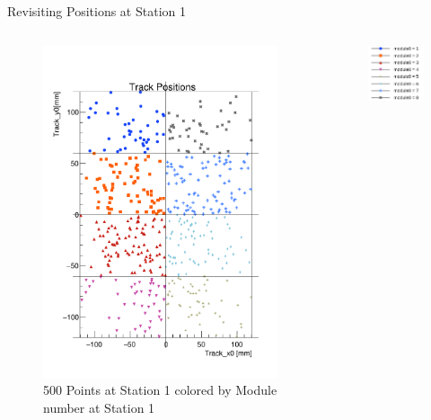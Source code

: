 \begin{frame}{Revisiting Positions at Station 1}
    \begin{columns}
        \begin{column}{1.2\linewidth}
            \begin{figure}
                \centering
                \includegraphics[height=0.8\textheight]{./ModuleLevelPlots/Positions_st0_module0.pdf}
                \caption{500 Points at Station 1 colored by Module number at Station 1}
            \end{figure}
        \end{column}
        \begin{column}{0.2\linewidth}
            \begin{figure}
                \hspace{-7cm}\includegraphics[scale=0.25]{./assets/image.png}

\end{figure}
\end{column}
\end{columns}
\end{frame}
